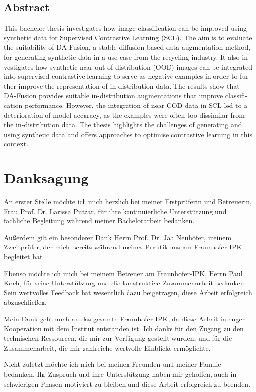 {
  \begin{otherlanguage}{english}
    \section*{Abstract}

      This bachelor thesis investigates how image classification can be improved using synthetic data for Supervised Contrastive Learning (SCL). The aim is to evaluate the suitability of DA-Fusion, a stable diffusion-based data augmentation method, for generating synthetic data in a use case from the recycling industry. It also investigates how synthetic near out-of-distribution (OOD) images can be integrated into supervised contrastive learning to serve as negative examples in order to further improve the representation of in-distribution data. The results show that DA-Fusion provides suitable in-distribution augmentations that improve classification performance. However, the integration of near OOD data in SCL led to a deterioration of model accuracy, as the examples were often too dissimilar from the in-distribution data. The thesis highlights the challenges of generating and using synthetic data and offers approaches to optimise contrastive learning in this context.
  \end{otherlanguage}
}

\newpage
\thispagestyle{empty}

\chapter*{Danksagung}

An erster Stelle möchte ich mich herzlich bei meiner Erstprüferin und Betreuerin, Frau Prof. Dr. Larissa Putzar, für ihre kontinuierliche Unterstützung und fachliche Begleitung während meiner Bachelorarbeit bedanken.

Außerdem gilt ein besonderer Dank Herrn Prof. Dr. Jan Neuhöfer, meinem Zweitprüfer, der mich bereits während meines Praktikums am Fraunhofer-IPK begleitet hat.

Ebenso möchte ich mich bei meinem Betreuer am Fraunhofer-IPK, Herrn Paul Koch, für seine Unterstützung und die konstruktive Zusammenarbeit bedanken. Sein wertvolles Feedback hat wesentlich dazu beigetragen, diese Arbeit erfolgreich abzuschließen.

Mein Dank geht auch an das gesamte Fraunhofer-IPK, da diese Arbeit in enger Kooperation mit dem Institut entstanden ist. Ich danke für den Zugang zu den technischen Ressourcen, die mir zur Verfügung gestellt wurden, und für die Zusammenarbeit, die mir zahlreiche wertvolle Einblicke ermöglichte.

Nicht zuletzt möchte ich mich bei meinen Freunden und meiner Familie bedanken. Ihr Zuspruch und ihre Unterstützung haben mir geholfen, auch in schwierigen Phasen motiviert zu bleiben und diese Arbeit erfolgreich zu beenden.